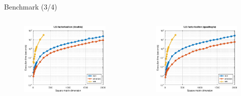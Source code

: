 \begin{frame}{Benchmark (3/4)}

\begin{columns}
\begin{column}{0.3\textwidth}
\begin{figure}
\centering
\includegraphics[width=1.0\linewidth]{res/data/2021-11-24_run-01-lu-double-semilogy}
\end{figure}
\end{column}
\begin{column}{0.3\textwidth}
\begin{figure}
\centering
\includegraphics[width=1.0\linewidth]{res/data/2021-11-24_run-01-lu-quadruple-semilogy}

\end{figure}
\end{column}
\end{columns}
\end{frame}
